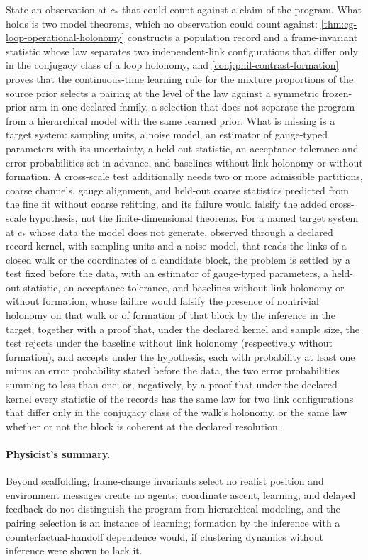State an observation at \(c_*\) that could count against a claim of the program.
What holds is two model theorems, which no observation could count against:
\cref{thm:cg-loop-operational-holonomy} constructs a
population record and a frame-invariant statistic whose law separates two
independent-link configurations that differ only in the conjugacy class of a
loop holonomy, and \cref{conj:phil-contrast-formation} proves that the
continuous-time learning rule for the mixture proportions of the source prior
selects a pairing at the level of the law against a symmetric frozen-prior arm
in one declared family, a selection that does not separate the program from a
hierarchical model with the same learned prior. What is missing is a
target system: sampling units, a noise model, an estimator of gauge-typed
parameters with its uncertainty, a held-out statistic, an acceptance tolerance
and error probabilities set in advance, and baselines without link holonomy or
without formation. A
cross-scale test additionally needs two or more admissible partitions,
coarse channels, gauge alignment, and held-out coarse statistics predicted from
the fine fit without coarse refitting, and its failure would falsify the added
cross-scale hypothesis, not the finite-dimensional theorems. For a named
target system at \(c_*\) whose data the model does not generate, observed
through a declared record kernel, with sampling units and a noise model, that
reads the links of a closed walk or the coordinates of a candidate block, the
problem is settled by a test fixed before the data, with an estimator of
gauge-typed parameters, a held-out statistic, an acceptance tolerance, and
baselines without link holonomy or without formation, whose failure would
falsify the presence of nontrivial holonomy on that walk or of formation of
that block by the inference in the target, together with a proof that, under
the declared kernel and sample size, the test rejects under the baseline
without link holonomy (respectively without formation), and accepts under the
hypothesis, each with probability at least one minus an error probability
stated before the data, the two error probabilities summing to less than one;
or, negatively, by a proof that under the declared kernel every
statistic of the records has the same law for two link configurations that
differ only in the conjugacy class of the walk's holonomy, or the same law
whether or not the block is coherent at the declared resolution.

\paragraph{Physicist's summary.}
Beyond scaffolding, frame-change invariants select no realist position and
environment messages create no agents; coordinate ascent, learning, and delayed
feedback do not distinguish the program from hierarchical modeling, and the
pairing selection is an instance of learning; formation by the inference with a
counterfactual-handoff dependence would, if clustering dynamics without
inference were shown to lack it.
